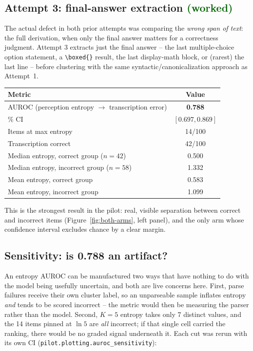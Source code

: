 \documentclass[11pt]{article}
\newcommand{\worked}[1]{\textcolor{darkgreen}{\textbf{#1}}}
\begin{document}
\subsection{Attempt 3: final-answer extraction \worked{(worked)}}

The actual defect in both prior attempts was comparing the \emph{wrong span of
text}: the full derivation, when only the final answer matters for a
correctness judgment. Attempt 3 extracts just the final answer -- the last
multiple-choice option statement, a \verb|\boxed{}| result, the last
display-math block, or (rarest) the last line -- before clustering with the
same syntactic/canonicalization approach as Attempt~1.

\begin{center}
\begin{tabular}{lc}
\toprule
Metric & Value \\
\midrule
AUROC (perception entropy $\rightarrow$ transcription error) & \textbf{0.788} \\
\quad 95\% CI & $[0.697, 0.869]$ \\
Items at max entropy & 14/100 \\
Transcription correct & 42/100 \\
Median entropy, correct group ($n=42$) & 0.500 \\
Median entropy, incorrect group ($n=58$) & 1.332 \\
Mean entropy, correct group & 0.583 \\
Mean entropy, incorrect group & 1.099 \\
\bottomrule
\end{tabular}
\end{center}

This is the strongest result in the pilot: real, visible separation between
correct and incorrect items (Figure~\ref{fig:both-arms}, left panel), and the
only arm whose confidence interval excludes chance by a clear margin.

\subsection{Sensitivity: is 0.788 an artifact?}
\label{sec:perception-sensitivity}

An entropy AUROC can be manufactured two ways that have nothing to do with the
model being usefully uncertain, and both are live concerns here. First, parse
failures receive their own cluster label, so an unparseable sample inflates
entropy \emph{and} tends to be scored incorrect -- the metric would then be
measuring the parser rather than the model. Second, $K=5$ entropy takes only 7
distinct values, and the 14 items pinned at $\ln 5$ are \emph{all} incorrect;
if that single cell carried the ranking, there would be no graded signal
underneath it. Each cut was rerun with its own CI
(\texttt{pilot.plotting.auroc\_sensitivity}):
\end{document}
